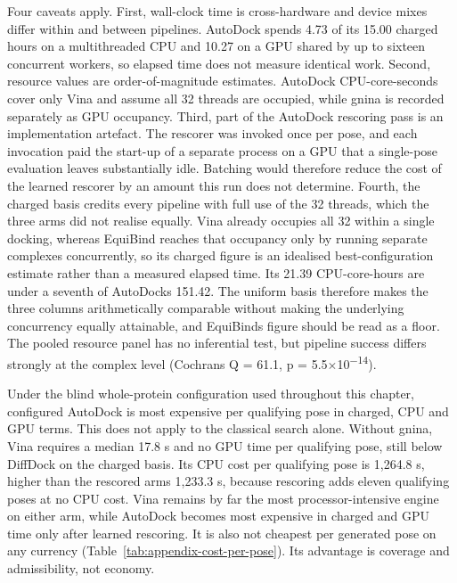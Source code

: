 Four caveats apply. First, wall-clock time is cross-hardware and device mixes differ within and between pipelines. AutoDock spends 4.73 of its 15.00 charged hours on a multithreaded CPU and 10.27 on a GPU shared by up to sixteen concurrent workers, so elapsed time does not measure identical work. Second, resource values are order-of-magnitude estimates. AutoDock CPU-core-seconds cover only Vina and assume all 32 threads are occupied, while gnina is recorded separately as GPU occupancy. Third, part of the AutoDock rescoring pass is an implementation artefact. The rescorer was invoked once per pose, and each invocation paid the start-up of a separate process on a GPU that a single-pose evaluation leaves substantially idle. Batching would therefore reduce the cost of the learned rescorer by an amount this run does not determine. Fourth, the charged basis credits every pipeline with full use of the 32 threads, which the three arms did not realise equally. Vina already occupies all 32 within a single docking, whereas EquiBind reaches that occupancy only by running separate complexes concurrently, so its charged figure is an idealised best-configuration estimate rather than a measured elapsed time. Its 21.39 CPU-core-hours are under a seventh of AutoDock\textquotesingle s 151.42. The uniform basis therefore makes the three columns arithmetically comparable without making the underlying concurrency equally attainable, and EquiBind\textquotesingle s figure should be read as a floor. The pooled resource panel has no inferential test, but pipeline success differs strongly at the complex level (Cochran\textquotesingle s Q = 61.1, p = 5.5\ensuremath{\times}10\textsuperscript{\ensuremath{-}14}).

Under the blind whole-protein configuration used throughout this chapter, configured AutoDock is most expensive per qualifying pose in charged, CPU and GPU terms. This does not apply to the classical search alone. Without gnina, Vina requires a median 17.8 s and no GPU time per qualifying pose, still below DiffDock on the charged basis. Its CPU cost per qualifying pose is 1,264.8 s, higher than the rescored arm\textquotesingle s 1,233.3 s, because rescoring adds eleven qualifying poses at no CPU cost. Vina remains by far the most processor-intensive engine on either arm, while AutoDock becomes most expensive in charged and GPU time only after learned rescoring. It is also not cheapest per generated pose on any currency (Table~\ref{tab:appendix-cost-per-pose}). Its advantage is coverage and admissibility, not economy.

